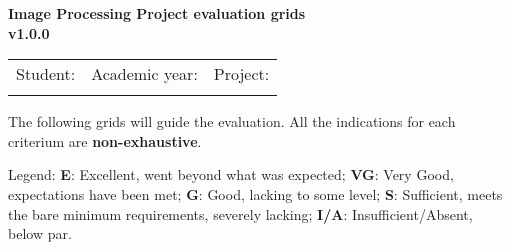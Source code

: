 \documentclass[a4paper,11pt,oneside]{article}
\begin{document}
\begin{center}
\Large
\textbf{Image Processing Project evaluation grids\\{\footnotesize v1.0.0}}
\end{center}

\begin{tabular}{|>{\raggedright\arraybackslash}p{8cm}|>{\raggedright\arraybackslash}p{4.5cm}|>{\raggedright\arraybackslash}p{5cm}|} \hline
Student: & Academic year: & Project: \\
 & & \\
\hline
\end{tabular}

\vspace*{0.2cm}

The following grids will guide the evaluation. All the indications for each criterium are \textbf{non-exhaustive}.

Legend: \textbf{E}: Excellent, went beyond what was expected; \textbf{VG}: Very Good, expectations have been met; \textbf{G}: Good, lacking to some level; \textbf{S}: Sufficient, meets the bare minimum requirements, severely lacking; \textbf{I/A}: Insufficient/Absent, below par.

\vspace*{0.2cm}

\end{document}
